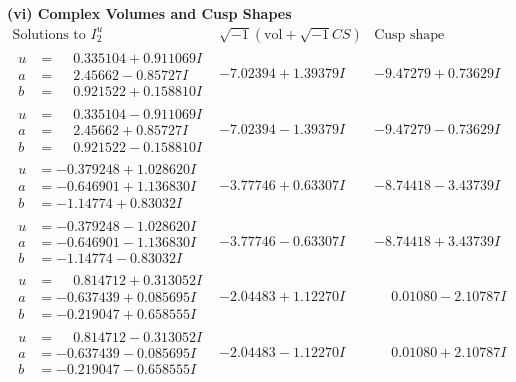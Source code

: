 \documentclass[1p]{elsarticle_modified}
\theoremstyle{definition}
\newcommand{\I}{\sqrt{-1}}
\begin{document}
\newpage\flushleft \textbf{(vi) Complex Volumes and Cusp Shapes}
$$\begin{array}{c|c|c}  
\text{Solutions to }I^u_{2}& \I (\text{vol} + \sqrt{-1}CS) & \text{Cusp shape}\\
 \hline 
\begin{aligned}
u &= \phantom{-}0.335104 + 0.911069 I \\
a &= \phantom{-}2.45662 - 0.85727 I \\
b &= \phantom{-}0.921522 + 0.158810 I\end{aligned}
 & -7.02394 + 1.39379 I & -9.47279 + 0.73629 I \\ \hline\begin{aligned}
u &= \phantom{-}0.335104 - 0.911069 I \\
a &= \phantom{-}2.45662 + 0.85727 I \\
b &= \phantom{-}0.921522 - 0.158810 I\end{aligned}
 & -7.02394 - 1.39379 I & -9.47279 - 0.73629 I \\ \hline\begin{aligned}
u &= -0.379248 + 1.028620 I \\
a &= -0.646901 + 1.136830 I \\
b &= -1.14774 + 0.83032 I\end{aligned}
 & -3.77746 + 0.63307 I & -8.74418 - 3.43739 I \\ \hline\begin{aligned}
u &= -0.379248 - 1.028620 I \\
a &= -0.646901 - 1.136830 I \\
b &= -1.14774 - 0.83032 I\end{aligned}
 & -3.77746 - 0.63307 I & -8.74418 + 3.43739 I \\ \hline\begin{aligned}
u &= \phantom{-}0.814712 + 0.313052 I \\
a &= -0.637439 + 0.085695 I \\
b &= -0.219047 + 0.658555 I\end{aligned}
 & -2.04483 + 1.12270 I & \phantom{-}0.01080 - 2.10787 I \\ \hline\begin{aligned}
u &= \phantom{-}0.814712 - 0.313052 I \\
a &= -0.637439 - 0.085695 I \\
b &= -0.219047 - 0.658555 I\end{aligned}
 & -2.04483 - 1.12270 I & \phantom{-}0.01080 + 2.10787 I \\ \hline\begin{aligned}

\end{aligned}
\end{array}$$
\end{document}
